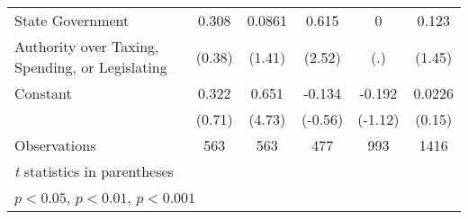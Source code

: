 {\begin{tabular}{l*{5}{c}}
\addlinespace
State Government&    0.308         &   0.0861         &    0.615\sym{*}  &        0         &    0.123         \\
Authority over Taxing, Spending, or Legislating&   (0.38)         &   (1.41)         &   (2.52)         &      (.)         &   (1.45)         \\
\addlinespace
Constant        &    0.322         &    0.651\sym{***}&   -0.134         &   -0.192         &   0.0226         \\
                &   (0.71)         &   (4.73)         &  (-0.56)         &  (-1.12)         &   (0.15)         \\
\midrule
Observations    &      563         &      563         &      477         &      993         &     1416         \\
\bottomrule
\multicolumn{6}{l}{\footnotesize \textit{t} statistics in parentheses}\\
\multicolumn{6}{l}{\footnotesize \sym{*} \(p<0.05\), \sym{**} \(p<0.01\), \sym{***} \(p<0.001\)}\\
\end{tabular}
}
